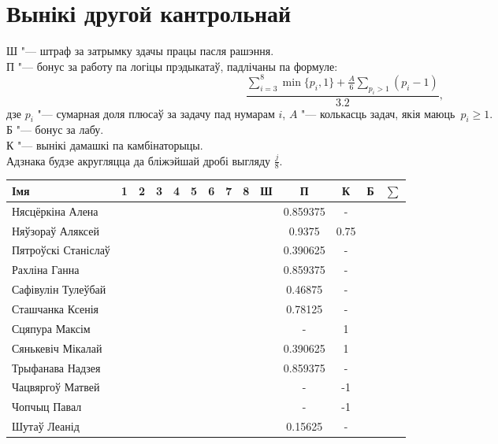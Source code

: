 


    \section{Вынікі другой кантрольнай}
    \noindent Ш "--- штраф за затрымку здачы працы пасля рашэння. \\
    П "--- бонус за работу па логіцы прэдыкатаў, падлічаны па формуле:
    $$\dfrac{\sum \limits _{i=3} ^8 \min\{p_i, 1\} + \frac{A}{6} \sum \limits _{p_i > 1} (p_i - 1)}{3.2},$$
    дзе $p_i$ "--- сумарная доля плюсаў за задачу пад нумарам $i$, $A$ "--- колькасць задач, якія маюць~$p_i \geqslant 1$. \\
    Б "--- бонус за лабу. \\
    К "--- вынікі дамашкі па камбінаторыцы. \\
    Адзнака будзе акругляцца да бліжэйшай дробі выгляду $\frac{j}{8}$.
\begin{table}[H]
	\begin{tabular}{|l|c|c|c|c|c|c|c|c|c|c|c|c|c|}
		\hline
		Імя                 & 1 & 2   &  3   &  4   &  5   & 6 &  7  &  8   &  Ш   &   П   & К &  Б   & $\sum$ \\ \hline
		Нясцёркіна Алена    &  &    &     &     &     &  &    &     &     &   0.859375   & - & &    \\ \hline
		Няўзораў Аляксей    &  &    &     &     &     &  &    &     &     &   0.9375   & 0.75  &  &       \\ \hline
		Пятроўскі Станіслаў &  &    &     &     &     &  &    &     &     &   0.390625   &  - &   &       \\ \hline
		Рахліна Ганна       &  &    &     &     &     &  &  &     &     & 0.859375  & - &     &  \\ \hline
		Сафівулін Тулеўбай  &  &    &     &     &     &  &    &     &     &  0.46875    &  -  & &       \\ \hline
		Сташчанка Ксенія    &  &  &  &     &     &  &    &     &     & 0.78125  &  -   & &    \\ \hline
		Сцяпура Максім      &  &    &     &     &  &  &    &  &     & - &  1   &   &    \\ \hline
		Сянькевіч Мікалай   &  &    &     &     &     &  &    &     &     &   0.390625   & 1 &   &       \\ \hline
		Трыфанава Надзея    &  &    &     &   &     &  &    &   &     &  0.859375  &  -   &   &  \\ \hline
		Чацвяргоў Матвей    &  &    &     &     &     &  &    &     &  &    -  &  -1  &   & \\ \hline
		Чопчыц Павал        &  &    &     &     &     &  &    &     &     & - &  -1   &     &  \\ \hline
		Шутаў Леанід        &  &    &     &  &     &  &    &     &     &  0.15625    &  -  & &    \\ \hline
	\end{tabular}
\end{table}


